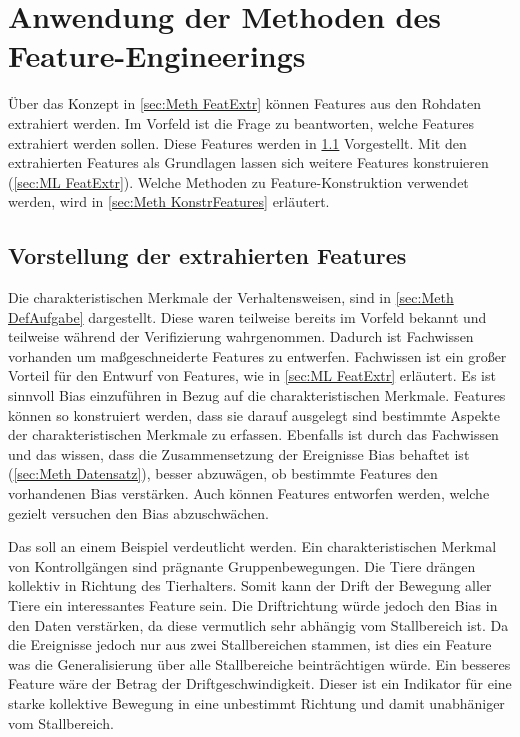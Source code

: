 \section{Anwendung der Methoden des Feature-Engineerings}
Über das Konzept in \ref{sec:Meth FeatExtr}  können Features aus den Rohdaten extrahiert werden. Im Vorfeld ist die Frage zu beantworten, welche Features extrahiert werden sollen. Diese Features werden in \ref{sec:Meth ExtrFeaturesVors} Vorgestellt. Mit den extrahierten Features als Grundlagen lassen sich weitere Features konstruieren (\ref{sec:ML FeatExtr}). Welche Methoden zu Feature-Konstruktion verwendet werden, wird in \ref{sec:Meth KonstrFeatures} erläutert.


\subsection{Vorstellung der extrahierten Features} \label{sec:Meth ExtrFeaturesVors}
Die charakteristischen Merkmale der Verhaltensweisen, sind in \ref{sec:Meth DefAufgabe} dargestellt. Diese waren teilweise bereits im Vorfeld bekannt und teilweise während der Verifizierung wahrgenommen. Dadurch ist Fachwissen vorhanden um maßgeschneiderte Features zu entwerfen. Fachwissen ist ein großer Vorteil für den Entwurf von Features, wie in \ref{sec:ML FeatExtr} erläutert. Es ist sinnvoll Bias einzuführen in Bezug auf die charakteristischen Merkmale. Features können so konstruiert werden, dass sie darauf ausgelegt sind bestimmte Aspekte der charakteristischen Merkmale zu erfassen. Ebenfalls ist durch das Fachwissen und das wissen, dass die Zusammensetzung der Ereignisse Bias behaftet ist (\ref{sec:Meth Datensatz}), besser abzuwägen, ob bestimmte Features den vorhandenen Bias verstärken. Auch können Features entworfen werden, welche gezielt versuchen den Bias abzuschwächen. \par

Das soll an einem Beispiel verdeutlicht werden. Ein charakteristischen Merkmal von Kontrollgängen sind prägnante Gruppenbewegungen. Die Tiere drängen kollektiv in Richtung des Tierhalters. Somit kann der Drift der Bewegung aller Tiere ein interessantes Feature sein. Die Driftrichtung würde jedoch den Bias in den Daten verstärken, da diese vermutlich sehr abhängig vom Stallbereich ist. Da die Ereignisse jedoch nur aus zwei Stallbereichen stammen, ist dies ein Feature was die Generalisierung über alle Stallbereiche beinträchtigen würde. Ein besseres Feature wäre der Betrag der Driftgeschwindigkeit. Dieser ist ein Indikator für eine starke kollektive Bewegung in eine unbestimmt Richtung und damit unabhäniger vom Stallbereich. \par 

